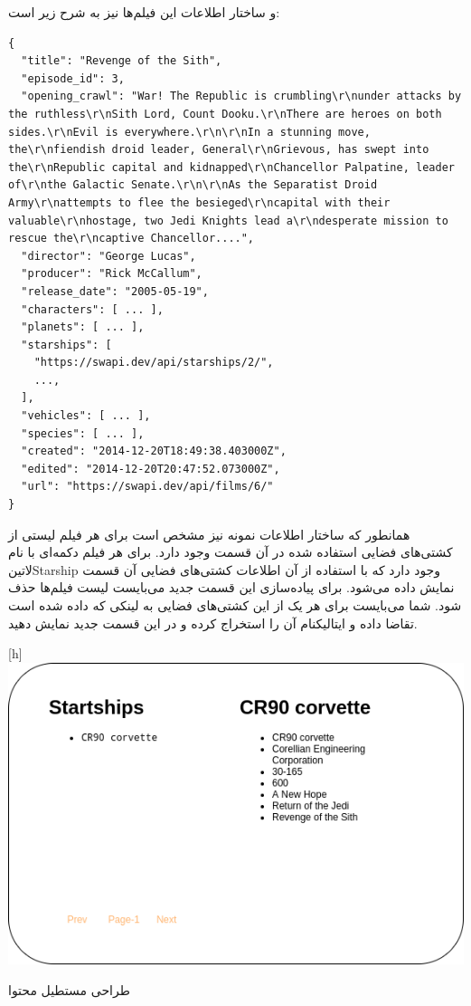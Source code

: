 \documentclass[../main.tex]{subfiles}
\begin{document}
و ساختار اطلاعات این فیلم‌ها نیز به شرح زیر است:

\begin{latin}
\begin{verbatim}
{
  "title": "Revenge of the Sith",
  "episode_id": 3,
  "opening_crawl": "War! The Republic is crumbling\r\nunder attacks by the ruthless\r\nSith Lord, Count Dooku.\r\nThere are heroes on both sides.\r\nEvil is everywhere.\r\n\r\nIn a stunning move, the\r\nfiendish droid leader, General\r\nGrievous, has swept into the\r\nRepublic capital and kidnapped\r\nChancellor Palpatine, leader of\r\nthe Galactic Senate.\r\n\r\nAs the Separatist Droid Army\r\nattempts to flee the besieged\r\ncapital with their valuable\r\nhostage, two Jedi Knights lead a\r\ndesperate mission to rescue the\r\ncaptive Chancellor....",
  "director": "George Lucas",
  "producer": "Rick McCallum",
  "release_date": "2005-05-19",
  "characters": [ ... ],
  "planets": [ ... ],
  "starships": [
    "https://swapi.dev/api/starships/2/",
    ...,
  ],
  "vehicles": [ ... ],
  "species": [ ... ],
  "created": "2014-12-20T18:49:38.403000Z",
  "edited": "2014-12-20T20:47:52.073000Z",
  "url": "https://swapi.dev/api/films/6/"
}
\end{verbatim}
\end{latin}

همانطور که ساختار اطلاعات نمونه نیز مشخص است برای هر فیلم لیستی از کشتی‌های فضایی استفاده شده در آن قسمت وجود دارد.
برای هر فیلم دکمه‌ای با نام ‌لاتین{Starship} وجود دارد که با استفاده از آن اطلاعات کشتی‌های فضایی آن قسمت نمایش داده می‌شود.
برای پیاده‌سازی این قسمت جدید می‌بایست لیست فیلم‌ها حذف شود.
شما می‌بایست برای هر یک از این کشتی‌های فضایی به لینکی که داده شده است تقاضا داده و ‌ایتالیک{نام} آن را استخراج کرده
و در این قسمت جدید نمایش دهید.

[h]
  \centering
  \includegraphics[scale=0.25]{./swapi-content}
  \caption{طراحی مستطیل محتوا}
\end{document}
